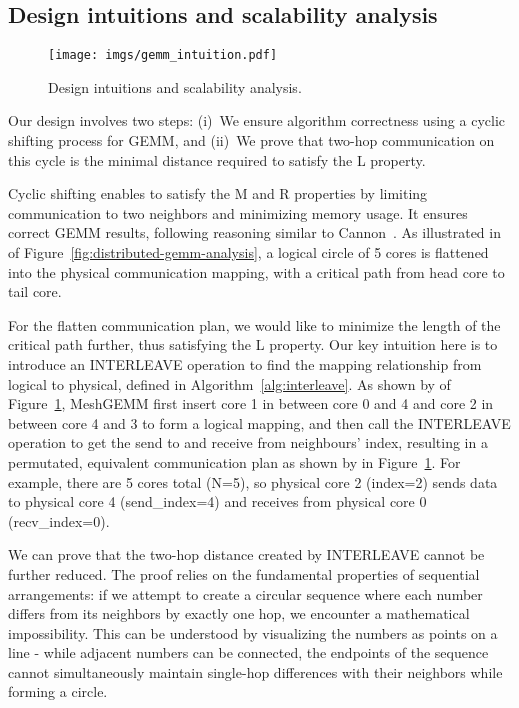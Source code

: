 \vspace{-0.2cm}
\subsection{Design intuitions and scalability analysis} 

\begin{figure}[t!]
    \centering
    \texttt{[image: imgs/gemm\_intuition.pdf]}
    \caption{Design intuitions and scalability analysis.}
    \label{fig:gemm_intuition}
\end{figure}

Our design involves two steps: (i)~We ensure algorithm correctness using a cyclic shifting process for GEMM, and (ii)~We prove that two-hop communication on this cycle is the minimal distance required to satisfy the L property.

 Cyclic shifting enables \gemm to satisfy the M and R properties by limiting communication to two neighbors and minimizing memory usage. It ensures correct GEMM results, following reasoning similar to Cannon~\cite{cannon}. As illustrated in  of Figure~\ref{fig:distributed-gemm-analysis}, a logical circle of 5 cores is flattened into the physical communication mapping, with a critical path from head core to tail core. 



 For the flatten communication plan, we would like to minimize the length of the critical path further, thus satisfying the L property. Our key intuition here is to introduce an INTERLEAVE operation to find the mapping relationship from logical to physical, defined in Algorithm~\ref{alg:interleave}. As shown by  of Figure~\ref{fig:gemm_intuition}, MeshGEMM first insert core 1 in between core 0 and 4 and core 2 in between core 4 and 3 to form a logical mapping, and then call the INTERLEAVE operation to get the send to and receive from neighbours' index, resulting in a permutated, equivalent communication plan as shown by  in Figure~\ref{fig:gemm_intuition}. For example, there are 5 cores total (N=5), so physical core 2 (index=2) sends data to physical core 4 (send\_index=4) and receives from physical core 0 (recv\_index=0).


  We can prove that the two-hop distance created by INTERLEAVE cannot be further reduced. The proof relies on the fundamental properties of sequential arrangements: if we attempt to create a circular sequence where each number differs from its neighbors by exactly one hop, we encounter a mathematical impossibility. This can be understood by visualizing the numbers as points on a line - while adjacent numbers can be connected, the endpoints of the sequence cannot simultaneously maintain single-hop differences with their neighbors while forming a circle.


